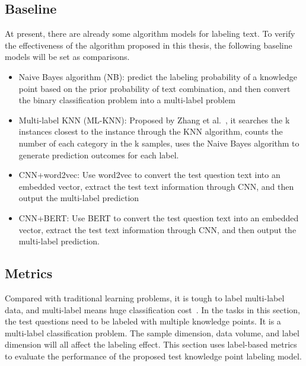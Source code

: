 \subsection{Baseline}
At present, there are already some algorithm models for labeling text. To verify the effectiveness of the algorithm proposed in this thesis, the following baseline models will be set as comparisons.
\begin{itemize}
    \item Naive Bayes algorithm (NB): predict the labeling probability of a knowledge point based on the prior probability of text combination, and then convert the binary classification problem into a multi-label problem
    \item Multi-label KNN (ML-KNN): Proposed by Zhang et al.~\cite{zhang2007ml}, it searches the k instances closest to the instance through the KNN algorithm, counts the number of each category in the k samples, uses the Naive Bayes algorithm to generate prediction outcomes for each label.
    \item CNN+word2vec: Use word2vec to convert the test question text into an embedded vector, extract the test text information through CNN, and then output the multi-label prediction
    \item CNN+BERT\@: Use BERT to convert the test question text into an embedded vector, extract the test text information through CNN, and then output the multi-label prediction.
\end{itemize}

\subsection{Metrics}
Compared with traditional learning problems, it is tough to label multi-label data, and multi-label means huge classification cost~\cite{zhang2013review}. In the tasks in this section, the test questions need to be labeled with multiple knowledge points. It is a multi-label classification problem. The sample dimension, data volume, and label dimension will all affect the labeling effect. This section uses label-based metrics to evaluate the performance of the proposed test knowledge point labeling model.

